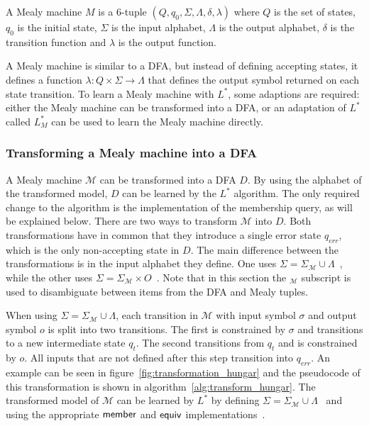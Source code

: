 \begin{definition}\label{def:mealy_machine}
  A Mealy machine $M$ is a 6-tuple $(Q, q_0, \Sigma, \Lambda, \delta, \lambda)$
  where $Q$ is the set of states, $q_0$ is the initial state, $\Sigma$ is the
  input alphabet, $\Lambda$ is the output alphabet, $\delta$ is the transition
  function and $\lambda$ is the output function.
\end{definition}

A Mealy machine is similar to a DFA, but instead of defining accepting states,
it defines a function $\lambda: Q \times \Sigma \to \Lambda$ that defines
the output symbol returned on each state transition. To learn a Mealy machine
with $L^*$, some adaptions are required: either the Mealy machine can be
transformed into a DFA, or an adaptation of $L^*$ called $L^*_{M}$ can be used
to learn the Mealy machine directly.

\subsubsection {Transforming a Mealy machine into a DFA}

A Mealy machine $\mathcal{M}$ can be transformed into a DFA $D$. By using the
alphabet of the transformed model, $D$ can be learned by the $L^*$ algorithm.
The only required change to the algorithm is the implementation of the
membership query, as will be explained below. There are two ways to transform
$\mathcal{M}$ into $D$. Both transformations have in common that they introduce
a single error state $q_{err}$, which is the only non-accepting state in $D$.
The main difference between the transformations is in the input alphabet they
define. One uses $\Sigma = \Sigma_\mathcal{M} \cup \Lambda$~\cite{Hungar2003},
while the other uses $\Sigma = \Sigma_\mathcal{M} \times O$~\cite{Makinen2001}.
Note that in this section the $_{\mathcal{M}}$ subscript is used to disambiguate
between items from the DFA and Mealy tuples.


When using $\Sigma = \Sigma_\mathcal{M} \cup \Lambda$, each transition in
$\mathcal{M}$ with input symbol $\sigma$ and output symbol $o$ is split into two
transitions. The first is constrained by $\sigma$ and transitions to a new
intermediate state $q_t$. The second transitions from $q_t$ and is constrained
by $o$. All inputs that are not defined after this step transition into
$q_{err}$. An example can be seen in figure~\ref{fig:transformation_hungar} and
the pseudocode of this transformation is shown in algorithm~\ref{alg:transform_hungar}. The transformed model of $\mathcal{M}$ can be
learned by $L^*$ by defining $\Sigma = \Sigma_\mathcal{M} \cup \Lambda$~\cite{Shahbaz2009} and using the appropriate $\mathsf{member}$ and $\mathsf{equiv}$ implementations~\cite{Hungar2003,Niese2003}.

